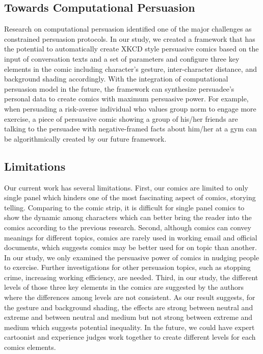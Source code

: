 \subsection{Towards Computational Persuasion}
Research on computational persuasion identified one of the major challenges as constrained persuasion protocols\cite{huntertowards}. In our study, we created a framework that has the potential to automatically create XKCD style persuasive comics based on the input of conversation texts and a set of parameters and configure three key elements in the comic including character's gesture, inter-character distance, and background shading accordingly. With the integration of computational persuasion model in the future, the framework can synthesize persuadee's personal data to create comics with maximum persuasive power. For example, when persuading a risk-averse individual who values group norm to engage more exercise, a piece of persuasive comic showing a group of his/her friends are talking to the persuadee with negative-framed facts about him/her at a gym can be algorithmically created by our future framework.

\subsection{Limitations}
Our current work has several limitations. First, our comics are limited to only single panel which hinders one of the most fascinating aspect of comics, storying telling. Comparing to the comic strip, it is difficult for single panel comics to show the dynamic among characters which can better bring the reader into the comics according to the previous research. Second, although comics can convey meanings for different topics, comics are rarely used in working email and official documents, which suggests comics may be better used for on topic than another. In our study, we only examined the persuasive power of comics in nudging people to exercise. Further investigations for other persuasion topics, such as stopping crime, increasing working efficiency, are needed. Third, in our study, the different levels of those three key elements in the comics are suggested by the authors where the differences among levels are not consistent. As our result suggests, for the gesture and background shading, the effects are strong between neutral and extreme and between neutral and medium but not strong between extreme and medium which suggests potential inequality. In the future, we could have expert cartoonist and experience judges work together to create different levels for each comics elements.
